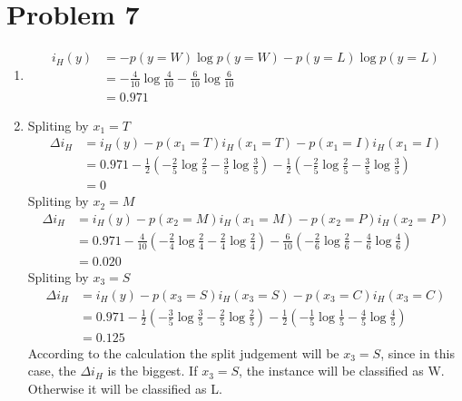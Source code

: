 \documentclass[12pt]{scrartcl}
\begin{document}
  \section*{Problem 7}
    \begin{enumerate}[label=\alph*)]
      \item 
      \begin{equation*}
        \begin{split}
          i_H(y) &= -p(y=W)\log{p(y=W)} - p(y=L)\log{p(y=L)}  \\
          &= -\frac{4}{10}\log{\frac{4}{10}} - \frac{6}{10}\log{\frac{6}{10}} \\
          &= 0.971
        \end{split} 
      \end{equation*}
      \item 
      Spliting by \(x_1 = T\) \\
      \[
        \begin{split}
          \Delta i_H &= i_H(y) - p(x_1 = T)i_H(x_1=T) - p(x_1=I)i_H(x_1=I) \\
          &= 0.971 - \frac1 2( -\frac2 5\log{\frac2 5} - \frac3 5\log{\frac3 5} ) 
          -\frac1 2( -\frac2 5\log{\frac2 5} - \frac3 5\log{\frac3 5} ) \\
          &= 0
        \end{split}
      \]
      Spliting by \(x_2 = M\) \\
      \[
        \begin{split}
          \Delta i_H &= i_H(y) - p(x_2 = M)i_H(x_1=M) - p(x_2=P)i_H(x_2=P) \\
          &= 0.971 - \frac4 {10}( -\frac2 4\log{\frac2 4} - \frac2 4\log{\frac2 4} ) 
          -\frac6 {10}( -\frac2 6\log{\frac2 6} - \frac4 6\log{\frac4 6} ) \\
          &= 0.020
        \end{split}
      \]
      Spliting by \(x_3 = S\) \\
      \[
        \begin{split}
          \Delta i_H &= i_H(y) - p(x_3 = S)i_H(x_3=S) - p(x_3=C)i_H(x_3=C) \\
          &= 0.971 - \frac1 2( -\frac3 5\log{\frac3 5} - \frac2 5\log{\frac2 5} ) 
          -\frac1 2( -\frac1 5\log{\frac1 5} - \frac4 5\log{\frac4 5} ) \\
          &= 0.125
        \end{split}
      \]
      According to the calculation the split judgement will be \(x_3 = S\), since
      in this case, the \(\Delta i_H\) is the biggest. If \(x_3 = S\), the instance
      will be classified as W. Otherwise it will be classified as L.
    \end{enumerate}
    
\end{document}
